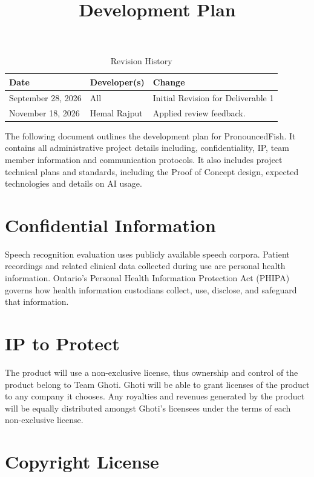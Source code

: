 \documentclass{article}
\title{Development Plan\\\progname}
\author{\authname}
\date{}
\begin{document}
\maketitle

\begin{table}[hp]
\caption{Revision History} \label{TblRevisionHistory}
\begin{tabularx}{\textwidth}{llX}
\toprule
\textbf{Date} & \textbf{Developer(s)} & \textbf{Change}\\
\midrule
September 28, 2026 & All & Initial Revision for Deliverable 1\\
November 18, 2026 & Hemal Rajput & Applied review feedback.\\
\bottomrule
\end{tabularx}
\end{table}

\newpage{}

The following document outlines the development plan for PronouncedFish. It contains all administrative project 
details including, confidentiality, IP, team member information and communication protocols. It also includes project technical plans and 
standards, including the Proof of Concept design, expected technologies and details on AI usage.

\section{Confidential Information}
Speech recognition evaluation uses publicly available speech corpora. Patient
recordings and related clinical data collected during use are personal
health information. Ontario's Personal Health Information Protection Act
(PHIPA) governs how health information custodians collect, use, disclose,
and safeguard that information.

\section{IP to Protect}

The product will use a non-exclusive license, thus ownership and control of the product belong to Team Ghoti. Ghoti will be able to grant licenses of the product to any company it chooses. Any royalties and revenues generated by the product will be equally distributed amongst Ghoti's licensees under the terms of each non-exclusive license. 

\section{Copyright License}
\end{document}
